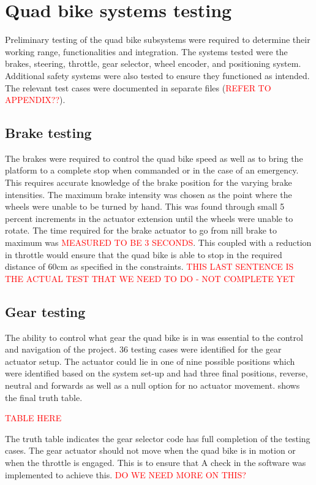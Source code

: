 \documentclass[main.tex]{subfiles}
\begin{document}
\section{Quad bike systems testing}
Preliminary testing of the quad bike subsystems were required to determine their working range, functionalities and integration. The systems tested were the brakes, steering, throttle, gear selector, wheel encoder, and positioning system. Additional safety systems were also tested to ensure they functioned as intended.
The relevant test cases were documented in separate files (\textcolor{red}{REFER TO APPENDIX??}).

\subsection{Brake testing}
The brakes were required to control the quad bike speed as well as to bring the platform to a complete stop when commanded or in the case of an emergency. This requires accurate knowledge of the brake position for the varying brake intensities. The maximum brake intensity was chosen as the point where the wheels were unable to be turned by hand. This was found through small 5 percent increments in the actuator extension until the wheels were unable to rotate. The time required for the brake actuator to go from nill brake to maximum was \textcolor{red}{MEASURED TO BE 3 SECONDS}. This coupled with a reduction in throttle would ensure that the quad bike is able to stop in the required distance of 60cm as specified in the constraints. \textcolor{red}{THIS LAST SENTENCE IS THE ACTUAL TEST THAT WE NEED TO DO - NOT COMPLETE YET}

\subsection{Gear testing}
The ability to control what gear the quad bike is in was essential to the control and navigation of the project. 36 testing cases were identified for the gear actuator setup. The actuator could lie in one of nine possible positions which were identified based on the system set-up and had three final positions, reverse, neutral and forwards as well as a null option for no actuator movement.  shows the final truth table.

\textcolor{red}{TABLE HERE}

The truth table indicates the gear selector code has full completion of the testing cases. The gear actuator should not move when the quad bike is in motion or when the throttle is engaged. This is to ensure that   A check in the software was implemented to achieve this. \textcolor{red}{DO WE NEED MORE ON THIS?}
\end{document}
